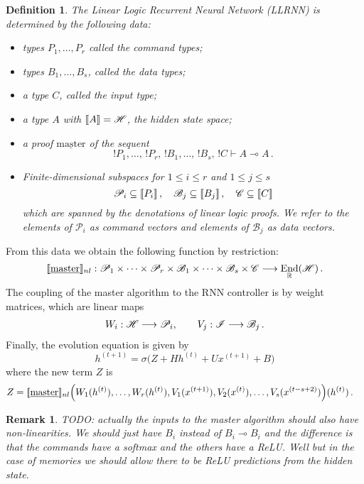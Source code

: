 \documentclass[english,letter paper,12pt,leqno]{article}
\theoremstyle{example}
\newtheorem{definition}[theorem]{Definition}
\newtheorem{remark}[theorem]{Remark}
\numberwithin{equation}{section}
\def\be{\begin{equation}}
\def\ee{\end{equation}}
\DeclareMathOperator{\End}{End}
\begin{document}
\begin{definition} The Linear Logic Recurrent Neural Network (LLRNN) is determined by the following data:
\begin{itemize}
\item types $P_1,\ldots,P_r$ called the \emph{command types};
\item types $B_1,\ldots,B_s$, called the \emph{data types};
\item a type $C$, called the \emph{input type};
\item a type $A$ with $\llbracket A \rrbracket = \mathscr{H}$, the hidden state space;
\item a proof $\underline{\mathrm{master}}$ of the sequent
\be
{!} P_1, \ldots, \, {!}P_r,\, {!} B_1, \ldots,\, {!} B_s,\, {!} C \vdash A \multimap A\,.
\ee
\item Finite-dimensional subspaces for $1 \le i \le r$ and $1 \le j \le s$
\be
\mathscr{P}_i \subseteq \den{P_i}\,, \quad \mathscr{B}_j \subseteq \den{B_j}\,, \quad \mathscr{C} \subseteq \den{C}
\ee
which are spanned by the denotations of linear logic proofs. We refer to the elements of $\mathscr{P}_i$ as \emph{command vectors} and elements of $\mathscr{B}_j$ as \emph{data vectors}.
\end{itemize}
\end{definition}
From this data we obtain the following function by restriction:
\be
\den{\underline{\mathrm{master}}}_{nl}: \mathscr{P}_1 \times \cdots \times \mathscr{P}_r \times \mathscr{B}_1 \times \cdots \times \mathscr{B}_s \times \mathscr{C} \lto \End_{\mathbb{R}}(\mathscr{H})\,.
\ee
The coupling of the master algorithm to the RNN controller is by weight matrices, which are linear maps
\begin{align*}
W_i: \mathscr{H} \longrightarrow \mathscr{P}_i, \qquad
V_j: \mathscr{I} \longrightarrow \mathscr{B}_j\,.
\end{align*}
Finally, the evolution equation is given by
\be
h^{(t+1)} = \sigma\Big( Z + H h^{(t)} + U x^{(t+1)} + B\Big)
\ee
where the new term $Z$ is
\begin{align*}
Z &= \llbracket \underline{\mathrm{master}} \rrbracket_{nl}\Big( W_1(h^{(t)}), \ldots, W_r(h^{(t)}), V_1(x^{(t+1)}), V_2(x^{(t)}), \ldots, V_s(x^{(t-s+2)})\Big)(h^{(t)})\,.
\end{align*}

\begin{remark} TODO: actually the inputs to the master algorithm should also have non-linearities. We should just have $B_i$ instead of $B_i \multimap B_i$ and the difference is that the commands have a softmax and the others have a ReLU. Well but in the case of memories we should allow there to be ReLU predictions from the hidden state.
\end{remark}
\end{document}
